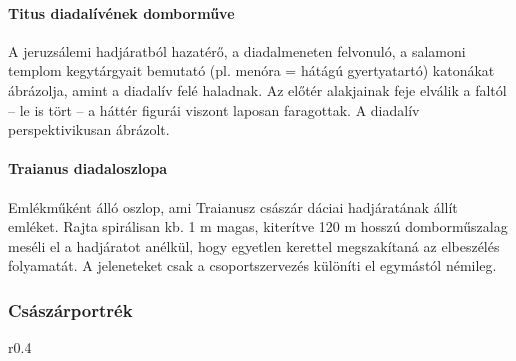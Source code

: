 \paragraph{Titus diadalívének domborműve}
A jeruzsálemi hadjáratból hazatérő, a diadalmeneten felvonuló, a salamoni templom kegytárgyait bemutató (pl. menóra = hátágú gyertyatartó) katonákat ábrázolja, amint a diadalív felé haladnak. Az előtér alakjainak feje elválik a faltól – le is tört – a háttér figurái viszont laposan faragottak. A diadalív perspektivikusan ábrázolt.

\paragraph{Traianus diadaloszlopa}
Emlékműként álló oszlop, ami Traianusz császár dáciai hadjáratának állít emléket. Rajta spirálisan kb. 1 m magas, kiterítve 120 m hosszú domborműszalag meséli el a hadjáratot anélkül, hogy egyetlen kerettel megszakítaná az elbeszélés folyamatát. A jeleneteket csak a csoportszervezés különíti el egymástól némileg.

\begin{figure}[H]
	\begin{minipage}{0.5\textwidth}
	\end{minipage}
	\hfill
	\begin{minipage}{0.45\textwidth}
	\end{minipage}	
\end{figure}

\subsubsection{Császárportrék}

\begin{wrapfigure}{r}{0.4\textwidth}
\end{wrapfigure}

